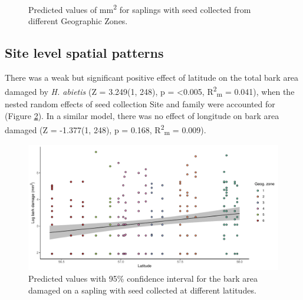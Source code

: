 \documentclass[a4paper, 11pt]{article}
\begin{document}
\begin{figure}[H]
\centering
	\caption{Predicted values of mm\textsuperscript{2} for saplings with seed collected from different Geographic Zones.}
	\label{pred_lmer}
\end{figure}




\subsection*{Site level spatial patterns}

There was a weak but significant positive effect of latitude on the total bark area damaged by \textit{H. abietis} (Z = 3.249(1, 248), p =  \textless{}0.005, R\textsuperscript{2}\textsubscript{m} = 0.041), when the nested random effects of seed collection Site and family were accounted for (Figure \ref{pred_lat}). In a similar model, there was no effect of longitude on bark area damaged (Z = -1.377(1, 248), p = 0.168, R\textsuperscript{2}\textsubscript{m} = 0.009).  

\begin{figure}[H]
	\includegraphics[width=\textwidth]{pred_lat}
	\caption{Predicted values with 95\% confidence interval for the bark area damaged on a sapling with seed  collected at different latitudes.}
	\label{pred_lat}
\end{figure}
\end{document}
